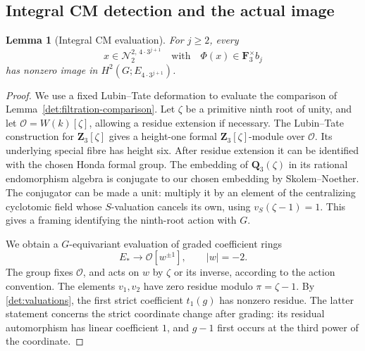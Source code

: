 \documentclass[11pt]{article}
\newtheorem{lemma}[theorem]{Lemma}
\theoremstyle{definition}
\theoremstyle{remark}
\numberwithin{equation}{section}
\begin{document}
\subsection{Integral CM detection and the actual image}

\begin{lemma}[Integral CM evaluation]\label{det:cm-evaluation}
For \(j\geq2\), every
\[
 x\in\mathcal N_2^{2,\,4\cdot3^{j+1}}
 \quad\text{with}\quad
 \Phi(x)\in\mathbf F_3^\times b_j
\]
has nonzero image in \(H^2(G;E_{4\cdot3^{j+1}})\).
\end{lemma}

\begin{proof}
We use a fixed Lubin--Tate deformation to evaluate the
comparison of Lemma~\ref{det:filtration-comparison}.
Let \(\zeta\) be a primitive ninth root of unity, and let
\(\mathcal O=W(k)[\zeta]\), allowing a residue extension if necessary.
The Lubin--Tate construction for \(\mathbf Z_3[\zeta]\)
\cite[Theorem~1]{LubinTateLocal}
gives a height-one formal \(\mathbf Z_3[\zeta]\)-module over
\(\mathcal O\).  Its underlying special fibre has height six.
After residue extension it can be identified with the chosen
Honda formal group.  The embedding of
\(\mathbf Q_3(\zeta)\) in its rational endomorphism algebra is conjugate
to our chosen embedding by Skolem--Noether.
The conjugator can be made a unit: multiply it by an element
of the centralizing cyclotomic field whose \(S\)-valuation
cancels its own, using \(v_S(\zeta-1)=1\).
This gives a framing identifying the ninth-root action with \(G\).

We obtain a \(G\)-equivariant evaluation of graded coefficient
rings
\[
 E_*\longrightarrow \mathcal O[w^{\pm1}],\qquad |w|=-2.
\]
The group fixes \(\mathcal O\), and acts on \(w\) by \(\zeta\)
or its inverse, according to the action convention.
The elements \(v_1,v_2\) have zero residue modulo
\(\pi=\zeta-1\).
By \eqref{det:valuations}, the first strict coefficient
\(t_1(g)\) has nonzero residue.
The latter statement concerns the strict coordinate change
after grading: its residual automorphism has linear coefficient
\(1\), and \(g-1\) first occurs at the third power of the
coordinate.


\end{proof}
\end{document}
